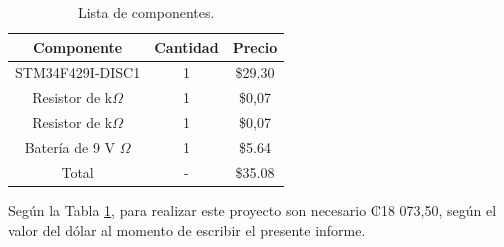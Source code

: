 \begin{table}[H]
\caption{Lista de componentes.}
\begin{center}
\begin{tabular}{c|c|c}
\hline
\textbf{Componente}&\textbf{Cantidad}&\textbf{Precio}\\
\hline
STM34F429I-DISC1 & 1 & \$29.30\\
Resistor de  k$\Omega$ & 1 & \$0,07\\
Resistor de  k$\Omega$ & 1 & \$0,07\\
Batería de 9 V $\Omega$ & 1 & \$5.64\\
\hline
Total & - & \$35.08\\
\end{tabular} \label{table:Equipo}
\end{center}
\end{table}

Según la Tabla \ref{table:Equipo}, para realizar este proyecto son necesario ₡18 073,50, según el valor del dólar al momento de escribir el presente informe. 